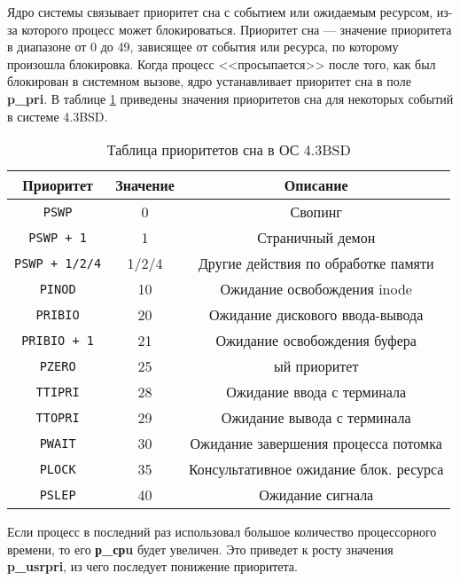 Ядро системы связывает приоритет сна с событием или ожидаемым ресурсом, из-за которого процесс может блокироваться.
Приоритет сна --- значение приоритета в диапазоне от 0 до 49, зависящее от события или ресурса, по которому произошла блокировка.
Когда процесс <<просыпается>> после того, как был блокирован в системном вызове, ядро устанавливает приоритет сна в поле \textbf{p\_pri}. 
В таблице \ref{tab:bsd} приведены значения приоритетов сна для некоторых событий в системе 4.3BSD.

\begin{table}[h]
	\caption{Таблица приоритетов сна в ОС 4.3BSD}
	\label{tab:bsd}
	\begin{center}
		\begin{tabular}{ |c|c|c|  }
			\hline
			\textbf{Приоритет} & \textbf{Значение} & \textbf{Описание} \\
			\hline
			\texttt{PSWP} & 0 & Свопинг \\
			\hline
			\texttt{PSWP + 1} & 1 & Страничный демон \\
			\hline
			\texttt{PSWP + 1/2/4} & 1/2/4 & Другие действия по обработке памяти \\
			\hline
			\texttt{PINOD} & 10 & Ожидание освобождения inode \\
			\hline
			\texttt{PRIBIO} & 20 & Ожидание дискового ввода-вывода \\
			\hline
			\texttt{PRIBIO + 1} & 21 & Ожидание освобождения буфера \\
			\hline
			\texttt{PZERO} & 25 & ый приоритет \\
			\hline
			\texttt{TTIPRI} & 28 & Ожидание ввода с терминала \\
			\hline
			\texttt{TTOPRI} & 29 & Ожидание вывода с терминала \\
			\hline 
			\texttt{PWAIT} & 30 & Ожидание завершения процесса потомка \\
			\hline
			\texttt{PLOCK} & 35 & Консультативное ожидание блок.
ресурса \\
			\hline
			\texttt{PSLEP} & 40 & Ожидание сигнала \\
			\hline
		\end{tabular}
	\end{center}
\end{table}

Если процесс в последний раз использовал большое количество процессорного времени, то его \textbf{р\_срu} будет увеличен.
Это приведет к росту значения \textbf{p\_usrpri}, из чего последует понижение приоритета.
 

